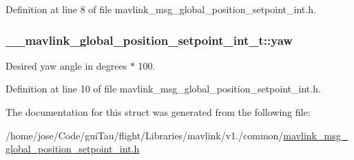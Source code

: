 Definition at line 8 of file mavlink\-\_\-msg\-\_\-global\-\_\-position\-\_\-setpoint\-\_\-int.\-h.

\hypertarget{struct____mavlink__global__position__setpoint__int__t_ab4e559ebe301ccdb64580e34febf2d86}{
\subsubsection[{yaw}]{ \-\_\-\-\_\-mavlink\-\_\-global\-\_\-position\-\_\-setpoint\-\_\-int\-\_\-t\-::yaw}}\label{struct____mavlink__global__position__setpoint__int__t_ab4e559ebe301ccdb64580e34febf2d86}


Desired yaw angle in degrees $\ast$ 100. 



Definition at line 10 of file mavlink\-\_\-msg\-\_\-global\-\_\-position\-\_\-setpoint\-\_\-int.\-h.



The documentation for this struct was generated from the following file\-:\begin{DoxyCompactItemize}
\item 
/home/jose/\-Code/gui\-Tau/flight/\-Libraries/mavlink/v1./common/\hyperlink{mavlink__msg__global__position__setpoint__int_8h}{mavlink\-\_\-msg\-\_\-global\-\_\-position\-\_\-setpoint\-\_\-int.\-h}\end{DoxyCompactItemize}
